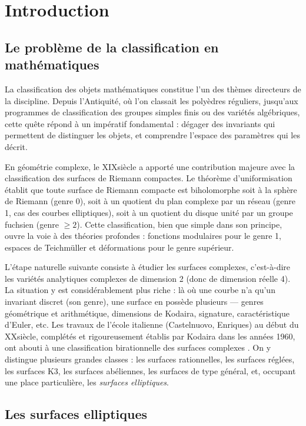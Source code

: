 \chapter*{Introduction}

\section*{Le problème de la classification en mathématiques}

La classification des objets mathématiques constitue l'un des thèmes directeurs de la discipline. Depuis l'Antiquité, où l'on classait les polyèdres réguliers, jusqu'aux programmes de classification des groupes simples finis ou des variétés algébriques, cette quête répond à un impératif fondamental : dégager des invariants qui permettent de distinguer les objets, et comprendre l'espace des paramètres qui les décrit.

En géométrie complexe, le XIX\ieme siècle a apporté une contribution majeure avec la classification des surfaces de Riemann compactes. Le théorème d'uniformisation établit que toute surface de Riemann compacte est biholomorphe soit à la sphère de Riemann (genre 0), soit à un quotient du plan complexe par un réseau (genre 1, cas des courbes elliptiques), soit à un quotient du disque unité par un groupe fuchsien (genre $\ge 2$). Cette classification, bien que simple dans son principe, ouvre la voie à des théories profondes : fonctions modulaires pour le genre 1, espaces de Teichmüller et déformations pour le genre supérieur.

L'étape naturelle suivante consiste à étudier les surfaces complexes, c'est-à-dire les variétés analytiques complexes de dimension 2 (donc de dimension réelle 4). La situation y est considérablement plus riche : là où une courbe n'a qu'un invariant discret (son genre), une surface en possède plusieurs — genres géométrique et arithmétique, dimensions de Kodaira, signature, caractéristique d'Euler, etc. Les travaux de l'école italienne (Castelnuovo, Enriques) au début du XX\ieme siècle, complétés et rigoureusement établis par Kodaira dans les années 1960, ont abouti à une classification birationnelle des surfaces complexes \cite{BHPV04}. On y distingue plusieurs grandes classes : les surfaces rationnelles, les surfaces réglées, les surfaces K3, les surfaces abéliennes, les surfaces de type général, et, occupant une place particulière, les \emph{surfaces elliptiques}.

\section*{Les surfaces elliptiques}


